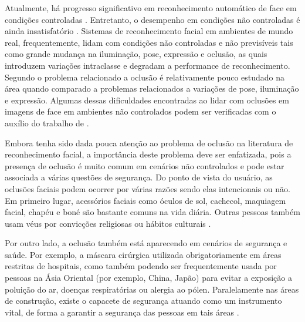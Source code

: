 Atualmente, há progresso significativo em reconhecimento automático de face em condições controladas \cite{min2014efficient}. Entretanto, o desempenho em condições não controladas é ainda insatisfatório  \cite{[4]wei2014dynamic}. Sistemas de reconhecimento facial em ambientes de mundo real, frequentemente, lidam com condições não controladas e não previsíveis tais como grande mudança na iluminação, pose, expressão e oclusão, as quais introduzem variações intraclasse e degradam a performance de reconhecimento. Segundo  o problema relacionado a oclusão é relativamente pouco estudado na área quando comparado a problemas relacionados a variações de pose, iluminação e expressão. Algumas dessas dificuldades encontradas ao lidar com oclusões em imagens de face em ambientes não controlados podem ser verificadas com o auxílio do trabalho de .




Embora tenha sido dada pouca atenção ao problema de oclusão na literatura de reconhecimento facial, a importância deste problema deve ser enfatizada, pois a presença de oclusão é muito comum em cenários não controlados e pode estar associada a várias questões de segurança. Do ponto de vista do usuário, as oclusões faciais podem ocorrer por várias razões sendo elas intencionais ou não. Em primeiro lugar, acessórios faciais como óculos de sol, cachecol, maquiagem facial, chapéu e boné são bastante comuns na vida diária. Outras pessoas também usam véus por convicções religiosas ou hábitos culturais \cite{min2014efficient}.

Por outro lado, a oclusão também está aparecendo em cenários de segurança e saúde. Por exemplo, a máscara cirúrgica utilizada obrigatoriamente em áreas restritas de hospitais, como também podendo ser frequentemente usada por pessoas na Ásia Oriental (por exemplo, China, Japão) para evitar a exposição a poluição do ar, doenças respiratórias ou alergia ao pólen. Paralelamente nas áreas de construção, existe o capacete de segurança atuando como um instrumento vital, de forma a garantir a segurança das pessoas em tais áreas \cite{du2011hard}.



